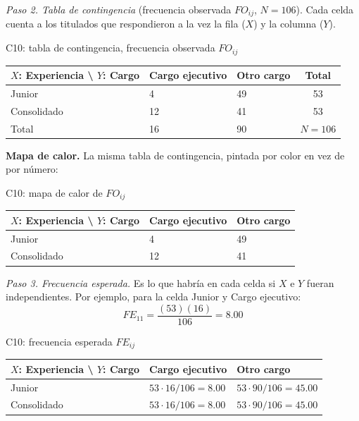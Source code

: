 \textit{Paso 2. Tabla de contingencia} (frecuencia observada $FO_{ij}$, $N = 106$). Cada celda cuenta a los titulados que respondieron a la vez la fila ($X$) y la columna ($Y$).

\begin{mitabla}{C10: tabla de contingencia, frecuencia observada $FO_{ij}$}
\begin{tabular}{L{3.8cm}C{3.00cm}C{3.00cm}|c}
\toprule
$X$: Experiencia \textbackslash{} $Y$: Cargo & Cargo ejecutivo & Otro cargo & Total \\
\midrule
Junior & 4 & 49 & 53 \\
Consolidado & 12 & 41 & 53 \\
\midrule
Total & 16 & 90 & $N = 106$ \\
\bottomrule
\end{tabular}
\end{mitabla}

\textbf{Mapa de calor.} La misma tabla de contingencia, pintada por color en vez de por número:

\begin{mitabla}{C10: mapa de calor de $FO_{ij}$}
\begin{tabular}{L{3.8cm}C{3.00cm}C{3.00cm}}
\toprule
$X$: Experiencia \textbackslash{} $Y$: Cargo & Cargo ejecutivo & Otro cargo \\
\midrule
Junior & 4 & 49 \\
Consolidado & 12 & 41 \\
\bottomrule
\end{tabular}
\end{mitabla}

\textit{Paso 3. Frecuencia esperada.} Es lo que habría en cada celda si $X$ e $Y$ fueran independientes. Por ejemplo, para la celda Junior y Cargo ejecutivo:
\[
FE_{11} = \frac{(53)(16)}{106} = 8.00
\]

\begin{mitabla}{C10: frecuencia esperada $FE_{ij}$}
\begin{tabular}{L{3.8cm}C{3.00cm}C{3.00cm}}
\toprule
$X$: Experiencia \textbackslash{} $Y$: Cargo & Cargo ejecutivo & Otro cargo \\
\midrule
Junior & $53\cdot16/106 = 8.00$ & $53\cdot90/106 = 45.00$ \\
Consolidado & $53\cdot16/106 = 8.00$ & $53\cdot90/106 = 45.00$ \\
\bottomrule
\end{tabular}
\end{mitabla}

